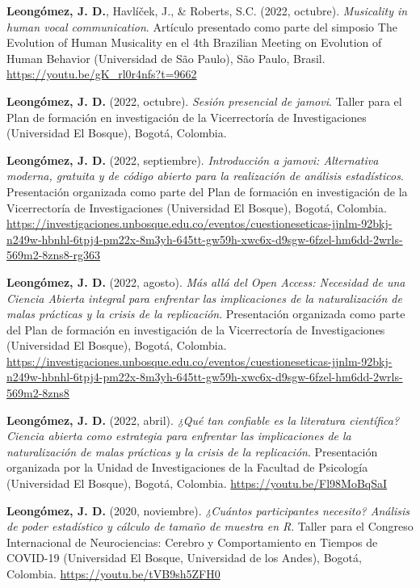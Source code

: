 \documentclass[11pt,a4paper,]{awesome-cv}
\begin{document}
\textbf{Leongómez, J. D.}, Havlíček, J., \& Roberts, S.C. (2022,
octubre). \emph{Musicality in human vocal communication}. Artículo
presentado como parte del simposio The Evolution of Human Musicality en
el 4th Brazilian Meeting on Evolution of Human Behavior (Universidad de
São Paulo), São Paulo, Brasil. \url{https://youtu.be/gK_rl0r4nfs?t=9662}

\textbf{Leongómez, J. D.} (2022, octubre). \emph{Sesión presencial de
jamovi}. Taller para el Plan de formación en investigación de la
Vicerrectoría de Investigaciones (Universidad El Bosque), Bogotá,
Colombia.

\textbf{Leongómez, J. D.} (2022, septiembre). \emph{Introducción a
jamovi: Alternativa moderna, gratuita y de código abierto para la
realización de análisis estadísticos}. Presentación organizada como
parte del Plan de formación en investigación de la Vicerrectoría de
Investigaciones (Universidad El Bosque), Bogotá, Colombia.
\url{https://investigaciones.unbosque.edu.co/eventos/cuestioneseticas-jjnlm-92bkj-n249w-hbnhl-6tpj4-pm22x-8m3yh-645tt-gw59h-xwc6x-d9sgw-6fzel-hm6dd-2wrls-569m2-8zns8-rg363}

\textbf{Leongómez, J. D.} (2022, agosto). \emph{Más allá del Open
Access: Necesidad de una Ciencia Abierta integral para enfrentar las
implicaciones de la naturalización de malas prácticas y la crisis de la
replicación}. Presentación organizada como parte del Plan de formación
en investigación de la Vicerrectoría de Investigaciones (Universidad El
Bosque), Bogotá, Colombia.
\url{https://investigaciones.unbosque.edu.co/eventos/cuestioneseticas-jjnlm-92bkj-n249w-hbnhl-6tpj4-pm22x-8m3yh-645tt-gw59h-xwc6x-d9sgw-6fzel-hm6dd-2wrls-569m2-8zns8}

\textbf{Leongómez, J. D.} (2022, abril). \emph{¿Qué tan confiable es la
literatura científica? Ciencia abierta como estrategia para enfrentar
las implicaciones de la naturalización de malas prácticas y la crisis de
la replicación}. Presentación organizada por la Unidad de
Investigaciones de la Facultad de Psicología (Universidad El Bosque),
Bogotá, Colombia. \url{https://youtu.be/Fl98MoBqSaI}

\textbf{Leongómez, J. D.} (2020, noviembre). \emph{¿Cuántos
participantes necesito? Análisis de poder estadístico y cálculo de
tamaño de muestra en R}. Taller para el Congreso Internacional de
Neurociencias: Cerebro y Comportamiento en Tiempos de COVID-19
(Universidad El Bosque, Universidad de los Andes), Bogotá, Colombia.
\url{https://youtu.be/tVB9sh5ZFH0}
\end{document}
